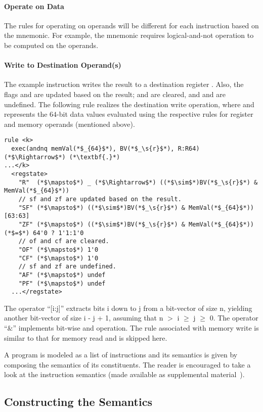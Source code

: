 \paragraph{Operate on Data}
The rules for operating on operands will be different for each instruction based on the mnemonic. For example, the mnemonic  requires logical-and-not operation to be computed on the operands.

\paragraph{Write to Destination Operand(s)}
The example instruction writes the result to a destination register . Also, the flags  and  are updated based on the result;  and   are cleared, and  and  are undefined. The following rule realizes the destination write operation, where  and  represents the $64$-bit data values evaluated using the respective rules for register and memory operands (mentioned above).
%
%
\begin{lstlisting}[style=KRULE]
rule <k>
  exec(andnq memVal(*$_{64}$*), BV(*$_\s{r}$*), R:R64) (*$\Rightarrow$*) (*\textbf{.}*)
...</k>
  <regstate>
    "R"  (*$\mapsto$*) _ (*$\Rightarrow$*) ((*$\sim$*)BV(*$_\s{r}$*) & MemVal(*$_{64}$*))
    // sf and zf are updated based on the result. 
    "SF" (*$\mapsto$*) ((*$\sim$*)BV(*$_\s{r}$*) & MemVal(*$_{64}$*))[63:63]
    "ZF" (*$\mapsto$*) ((*$\sim$*)BV(*$_\s{r}$*) & MemVal(*$_{64}$*)) (*$=$*) 64'0 ? 1'1:1'0
    // of and cf are cleared. 
    "OF" (*$\mapsto$*) 1'0
    "CF" (*$\mapsto$*) 1'0
    // sf and zf are undefined.
    "AF" (*$\mapsto$*) undef
    "PF" (*$\mapsto$*) undef
  ...</regstate>  
\end{lstlisting}
The operator ``[i:j]'' extracts bits i down to j from a bit-vector of size n, yielding another  bit-vector of size i - j + 1, assuming that n $>$ i $\ge$ j $\ge$ 0. The operator ``$\&$'' implements bit-wise and operation. The rule associated with memory write is similar to that for memory read and is skipped here. 

A \ISA program is modeled as a list of instructions and its semantics is  given by composing the semantics of its constituents. The reader is encouraged to take a look at the instruction semantics (made available as supplemental material~\cite{Suppl}).

\subsection{Constructing the \ISA Semantics}
\label{sec:Approach}

